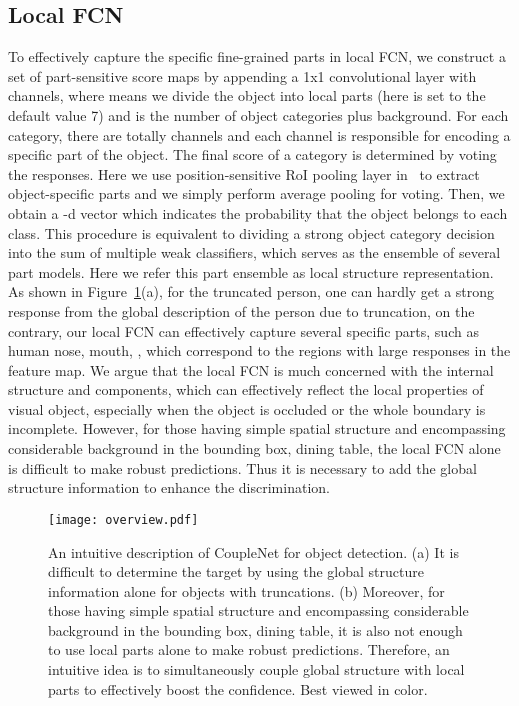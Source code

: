 \documentclass[10pt,twocolumn,letterpaper]{article}
\begin{document}
\subsection{Local FCN}
To effectively capture the specific fine-grained parts in local FCN, we construct a set of part-sensitive score maps by appending a 1x1 convolutional layer with  channels, where  means we divide the object into  local parts (here  is set to the default value 7) and  is the number of object categories plus background. For each category, there are totally  channels and each channel is responsible for encoding a specific part of the object. The final score of a category is determined by voting the  responses. Here we use position-sensitive RoI pooling layer in~\cite{li2016r} to extract object-specific parts and we simply perform average pooling for voting. Then, we obtain a -d vector which indicates the probability that the object belongs to each class. This procedure is equivalent to dividing a strong object category decision into the sum of multiple weak classifiers, which serves as the ensemble of several part models. Here we refer this part ensemble as local structure representation. As shown in Figure~\ref{overview}(a), for the truncated person, one can hardly get a strong response from the global description of the person due to truncation, on the contrary, our local FCN can effectively capture several specific parts, such as human nose, mouth, \etc, which correspond to the regions with large responses in the feature map. We argue that the local FCN is much concerned with the internal structure and components, which can effectively reflect the local properties of visual object, especially when the object is occluded or the whole boundary is incomplete. However, for those having simple spatial structure and encompassing considerable background in the bounding box, \eg dining table, the local FCN alone is difficult to make robust predictions. Thus it is necessary to add the global structure information to enhance the discrimination.

\begin{figure}[!t]
\begin{center}
\texttt{[image: overview.pdf]}
\end{center}
  \caption{An intuitive description of CoupleNet for object detection. (a) It is difficult to determine the target by using the global structure information alone for objects with truncations. (b) Moreover,
  for those having simple spatial structure and encompassing considerable background in the bounding box, \eg dining table, it is also not enough to use local parts alone to make robust predictions. Therefore, an intuitive idea is to simultaneously couple global structure with local parts to effectively boost the confidence. Best viewed in color.}
\label{overview}
\end{figure}
\end{document}
